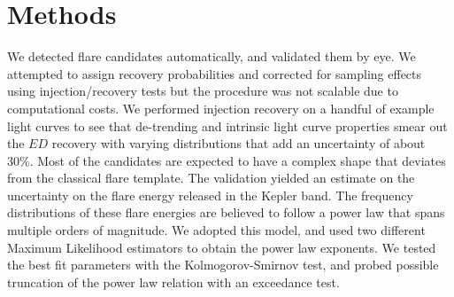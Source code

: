\documentclass{aa}
\begin{document}
\section{Methods}
We detected flare candidates automatically, and validated them by eye. We attempted to assign recovery probabilities and corrected for sampling effects using injection/recovery tests but the procedure was not scalable due to computational costs. We performed injection recovery on a handful of example light curves to see that de-trending and intrinsic light curve properties smear out the $ED$ recovery with varying distributions that add an uncertainty of about 30\%. Most of the candidates are expected to have a complex shape that deviates from the classical flare template. The validation yielded an estimate on the uncertainty on the flare energy released in the Kepler band. The frequency distributions of these flare energies are believed to follow a power law that spans multiple orders of magnitude. We adopted this model, and used two different Maximum Likelihood estimators to obtain the power law exponents. We tested the best fit parameters with the Kolmogorov-Smirnov test, and probed possible truncation of the power law relation with an exceedance test.
\end{document}
